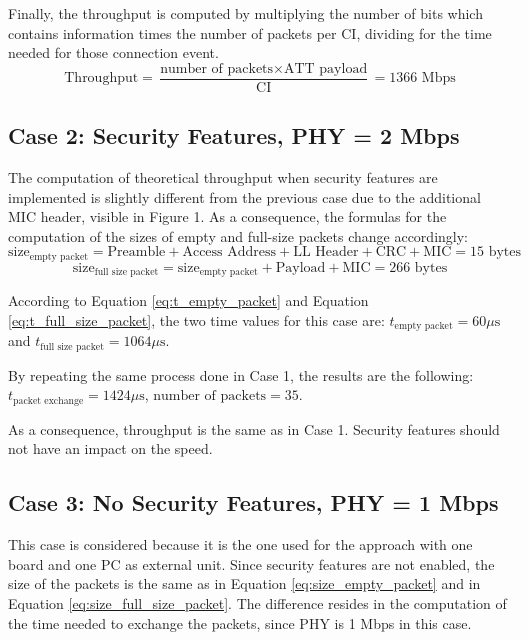 \documentclass{Configuration_Files/PoliMi3i_thesis}
\begin{document}
Finally, the throughput is computed by multiplying the number of bits which contains information times the number of packets per CI, dividing for the time needed for those connection event.
\begin{equation}
\text{Throughput} = \frac{\text{number of packets} \times \text{ATT payload}}{\text{CI}} = 1366 \text{ Mbps}
\label{eq:throughput_case1}
\end{equation}

\subsection*{Case 2: Security Features, PHY = 2 Mbps}

The computation of theoretical throughput when security features are implemented is slightly different from the previous case due to the additional MIC header, visible in Figure 1. As a consequence, the formulas for the computation of the sizes of empty and full-size packets change accordingly:
\begin{equation}
\text{size}_{\text{empty packet}} = \text{Preamble} + \text{Access Address} + \text{LL Header} + \text{CRC} + \text{MIC} = 15 \text{ bytes}
\label{eq:size_empty_packet_case2}
\end{equation}
\begin{equation}
\text{size}_{\text{full size packet}} = \text{size}_{\text{empty packet}} + \text{Payload} + \text{MIC} = 266 \text{ bytes}
\label{eq:size_full_size_packet_case2}
\end{equation}

According to Equation \ref{eq:t_empty_packet} and Equation \ref{eq:t_full_size_packet}, the two time values for this case are: $t_{\text{empty packet}} = 60 \mu \text{s}$ and $t_{\text{full size packet}} = 1064 \mu \text{s}$.

By repeating the same process done in Case 1, the results are the following: $t_{\text{packet exchange}} = 1424 \mu \text{s}$, $\text{number of packets} = 35$.

As a consequence, throughput is the same as in Case 1. Security features should not have an impact on the speed.

\subsection*{Case 3: No Security Features, PHY = 1 Mbps}

This case is considered because it is the one used for the approach with one board and one PC as external unit. Since security features are not enabled, the size of the packets is the same as in Equation \ref{eq:size_empty_packet} and in Equation \ref{eq:size_full_size_packet}. The difference resides in the computation of the time needed to exchange the packets, since PHY is 1 Mbps in this case.
\end{document}

